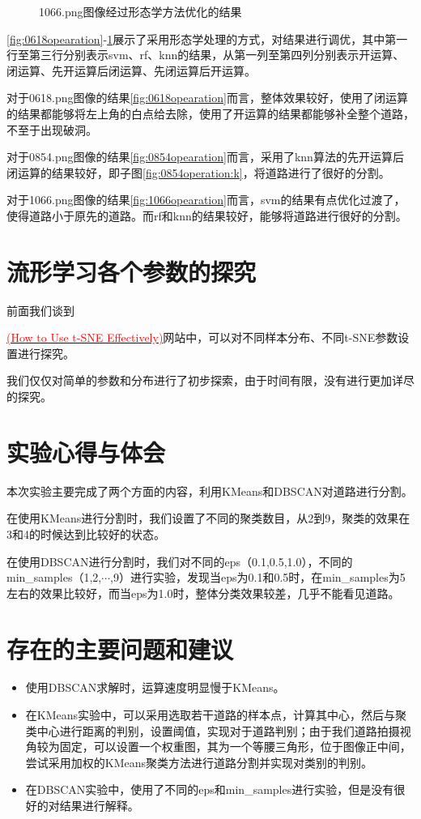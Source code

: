\documentclass[12pt,hyperref,a4paper,UTF8]{ctexart}
\begin{document}
{\begin{figure}[!h]
	\caption{1066.png图像经过形态学方法优化的结果}
	\label{fig:1066opearation}
\end{figure}


\autoref{fig:0618opearation}-\ref{fig:1066opearation}展示了采用形态学处理的方式，对结果进行调优，其中第一行至第三行分别表示svm、rf、knn的结果，从第一列至第四列分别表示开运算、闭运算、先开运算后闭运算、先闭运算后开运算。
\par
对于0618.png图像的结果\autoref{fig:0618opearation}而言，整体效果较好，使用了闭运算的结果都能够将左上角的白点给去除，使用了开运算的结果都能够补全整个道路，不至于出现破洞。
\par
对于0854.png图像的结果\autoref{fig:0854opearation}而言，采用了knn算法的先开运算后闭运算的结果较好，即子图\ref{fig:0854operation:k}，将道路进行了很好的分割。
\par
对于1066.png图像的结果\autoref{fig:1066opearation}而言，svm的结果有点优化过渡了，使得道路小于原先的道路。而rf和knn的结果较好，能够将道路进行很好的分割。

\section{流形学习各个参数的探究}
前面我们谈到{\href{https://distill.pub/2016/misread-tsne}{\textcolor{red}{(How to Use t-SNE Effectively)}}网站中，可以对不同样本分布、不同t-SNE参数设置进行探究。
	

	
\par	
我们仅仅对简单的参数和分布进行了初步探索，由于时间有限，没有进行更加详尽的探究。
	

\section{实验心得与体会}
本次实验主要完成了两个方面的内容，利用KMeans和DBSCAN对道路进行分割。

在使用KMeans进行分割时，我们设置了不同的聚类数目，从2到9，聚类的效果在3和4的时候达到比较好的状态。

在使用DBSCAN进行分割时，我们对不同的eps（0.1,0.5,1.0），不同的min\_samples（1,2,$\cdots$,9）进行实验，发现当eps为0.1和0.5时，在min\_samples为5左右的效果比较好，而当eps为1.0时，整体分类效果较差，几乎不能看见道路。


\section{存在的主要问题和建议}

\begin{itemize}
    \item 使用DBSCAN求解时，运算速度明显慢于KMeans。
    \item 在KMeans实验中，可以采用选取若干道路的样本点，计算其中心，然后与聚类中心进行距离的判别，设置阈值，实现对于道路判别；由于我们道路拍摄视角较为固定，可以设置一个权重图，其为一个等腰三角形，位于图像正中间，尝试采用加权的KMeans聚类方法进行道路分割并实现对类别的判别。
    \item 在DBSCAN实验中，使用了不同的eps和min\_samples进行实验，但是没有很好的对结果进行解释。
\end{itemize}


}}
\end{document}
